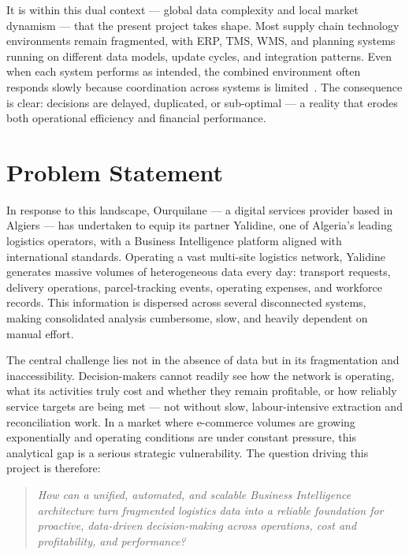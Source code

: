 It is within this dual context --- global data complexity and local market dynamism --- that the
present project takes shape. Most supply chain technology environments remain fragmented, with
ERP, TMS, WMS, and planning systems running on different data models, update cycles, and
integration patterns. Even when each system performs as intended, the combined environment often
responds slowly because coordination across systems is limited~\parencite{logisticsviewpoints2026}.
The consequence is clear: decisions are delayed, duplicated, or sub-optimal --- a reality that
erodes both operational efficiency and financial performance.

\section*{Problem Statement}

In response to this landscape, Ourquilane --- a digital services provider based in Algiers ---
has undertaken to equip its partner Yalidine, one of Algeria's leading logistics operators, with
a Business Intelligence platform aligned with international standards. Operating a vast
multi-site logistics network, Yalidine generates massive volumes of heterogeneous data every
day: transport requests, delivery operations, parcel-tracking events, operating expenses, and
workforce records. This information is dispersed across several disconnected systems, making
consolidated analysis cumbersome, slow, and heavily dependent on manual effort.

The central challenge lies not in the absence of data but in its fragmentation and
inaccessibility. Decision-makers cannot readily see how the network is operating, what its
activities truly cost and whether they remain profitable, or how reliably service targets are
being met --- not without slow, labour-intensive extraction and reconciliation work. In a market
where e-commerce volumes are growing exponentially and operating conditions are under constant
pressure, this analytical gap is a serious strategic vulnerability. The question driving this
project is therefore:

\begin{quote}
    \itshape
    How can a unified, automated, and scalable Business Intelligence architecture turn
    fragmented logistics data into a reliable foundation for proactive, data-driven
    decision-making across operations, cost and profitability, and performance?
\end{quote}

